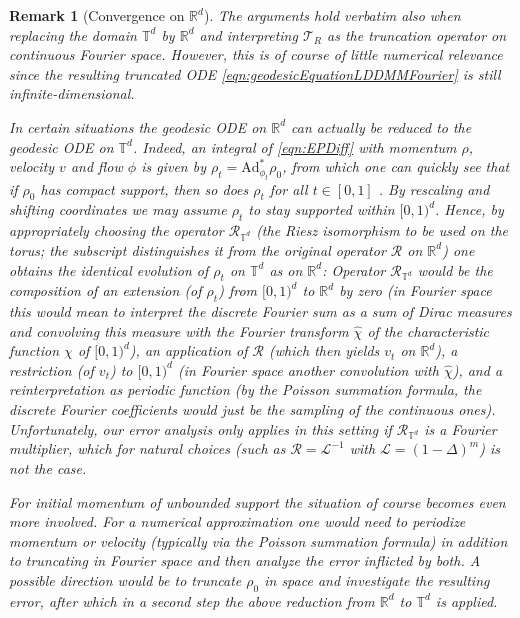 \documentclass[a4paper, 12pt]{article}
\newtheorem{remark}[theorem]{Remark}
\newcommand{\R}{\mathbb{R}}
\newcommand{\T}{\mathbb{T}}
\newcommand{\Riesz}{\mathcal{R}}
\renewcommand{\L}{\mathcal{L}}
\newcommand{\adjointMap}{\mathrm{Ad}}
\newcommand{\trunc}[1][R]{\mathcal{T}_{#1}}
\begin{document}
\begin{remark}[Convergence on $\R^d$]
The arguments hold verbatim also when replacing the domain $\T^d$ by $\R^d$ and interpreting $\trunc$ as the truncation operator on continuous Fourier space.
However, this is of course of little numerical relevance since the resulting truncated ODE \eqref{eqn:geodesicEquationLDDMMFourier} is still infinite-dimensional.

In certain situations the geodesic ODE on $\R^d$ can actually be reduced to the geodesic ODE on $\T^d$.
Indeed, an integral of \eqref{eqn:EPDiff} with momentum $\rho$, velocity $v$ and flow $\phi$ is given by $\rho_t=\adjointMap_{\phi_t}^*\rho_0$,
from which one can quickly see that if $\rho_0$ has compact support, then so does $\rho_t$ for all $t\in[0,1]$ \cite[Sec.\,4.3.1]{MiTrYo06}.
By rescaling and shifting coordinates we may assume $\rho_t$ to stay supported within $[0,1)^d$.
Hence, by appropriately choosing the operator $\Riesz_{\T^d}$ (the Riesz isomorphism to be used on the torus; the subscript distinguishes it from the original operator $\Riesz$ on $\R^d$)
one obtains the identical evolution of $\rho_t$ on $\T^d$ as on $\R^d$:
Operator $\Riesz_{\T^d}$ would be the composition of an extension (of $\rho_t$) from $[0,1)^d$ to $\R^d$ by zero
(in Fourier space this would mean to interpret the discrete Fourier sum as a sum of Dirac measures and convolving this measure with the Fourier transform $\hat\chi$ of the characteristic function $\chi$ of $[0,1)^d$),
an application of $\Riesz$ (which then yields $v_t$ on $\R^d$),
a restriction (of $v_t$) to $[0,1)^d$ (in Fourier space another convolution with $\hat\chi$),
and a reinterpretation as periodic function (by the Poisson summation formula, the discrete Fourier coefficients would just be the sampling of the continuous ones).
Unfortunately, our error analysis only applies in this setting if $\Riesz_{\T^d}$ is a Fourier multiplier, which for natural choices (such as $\Riesz=\L^{-1}$ with $\L=(1-\Delta)^m$) is not the case.

For initial momentum of unbounded support the situation of course becomes even more involved.
For a numerical approximation one would need to periodize momentum or velocity (typically via the Poisson summation formula)
in addition to truncating in Fourier space and then analyze the error inflicted by both.
A possible direction would be to truncate $\rho_0$ in space and investigate the resulting error,
after which in a second step the above reduction from $\R^d$ to $\T^d$ is applied.
\end{remark}
\end{document}
